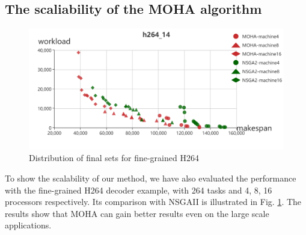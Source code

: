 \subsection{ The scaliability of the MOHA algorithm}
\begin{figure}[htp]
\centering
	\includegraphics[width=0.9\columnwidth]{./figures/h264_14}
\caption{Distribution of final sets  for fine-grained H264}
 \label{fig:finegrained}
\vspace{-4mm}
 \end{figure} 
To show the scalability of our method, we have also evaluated the performance with the fine-grained H264 decoder example, with 264 tasks and 4, 8, 16 processors respectively. Its comparison with NSGAII is illustrated  in Fig. \ref{fig:finegrained}. The results show that MOHA can gain better results even on the large scale applications. 


